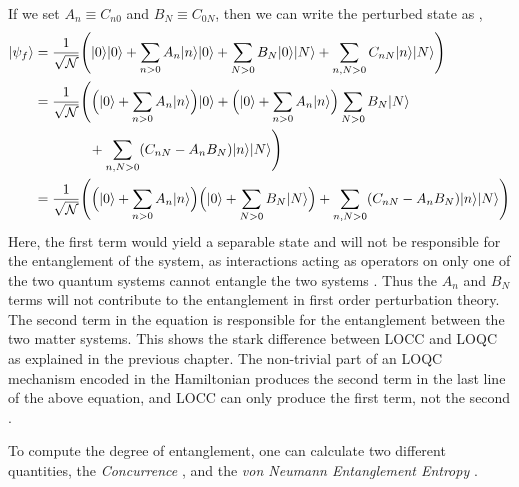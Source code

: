 \documentclass[12pt,a4paper]{report}
\theoremstyle{plain}
\theoremstyle{definition}
\theoremstyle{remark}
\DeclarePairedDelimiter\ket{\lvert}{\rangle}
\begin{document}
If we set $A_n \equiv C_{n0}$ and $B_N \equiv C_{0N}$, then we can write the perturbed state as \cite{Bala_2012},
\begin{equation}
    \begin{aligned}
        \ket{\psi_f} &= \frac{1}{\sqrt{\mathcal{N}}} \Bigg(\ket{0}\ket{0} + \sum_{n>0} A_n \ket{n}\ket{0} + \sum_{N>0} B_N \ket{0}\ket{N} + \sum_{n, N > 0} C_{nN} \ket{n}\ket{N}\Bigg) \\
        &= \frac{1}{\sqrt{\mathcal{N}}} \Bigg( \Big(\ket{0} + \sum_{n>0} A_n \ket{n}\Big) \ket{0} + \Big(\ket{0} + \sum_{n>0} A_n \ket{n}\Big) \sum_{N>0} B_N \ket{N}\\ &\qquad\qquad + \sum_{n, N > 0} (C_{nN} - A_nB_N) \ket{n}\ket{N} \Bigg)\\
        &= \frac{1}{\sqrt{\mathcal{N}}} \Bigg( \Big(\ket{0} + \sum_{n>0} A_n \ket{n}\Big)\Big(\ket{0} + \sum_{N>0} B_N \ket{N}\Big) + \sum_{n, N > 0} (C_{nN} - A_nB_N) \ket{n}\ket{N} \Bigg)\\
    \end{aligned}
\end{equation}
Here, the first term would yield a separable state and will not be responsible for the entanglement of the system, as interactions acting as operators on only one of the two quantum systems cannot entangle the two systems \cite{Bose_2022}. Thus the $A_n$ and $B_N$ terms will not contribute to the entanglement in first order perturbation theory. The second term in the equation is responsible for the entanglement between the two matter systems. This shows the stark difference between LOCC and LOQC as explained in the previous chapter. The non-trivial part of an LOQC mechanism encoded in the Hamiltonian produces the second term in the last line of the above equation, and LOCC can only produce the first term, not the second \cite{Bose_2022}.

To compute the degree of entanglement, one can calculate two different quantities, the \textit{Concurrence} \cite{PhysRevLett.78.5022, PhysRevA.64.042315}, and the \textit{von Neumann Entanglement Entropy} \cite{Bala_2012, PhysRevA.101.052110, suddho}.
\end{document}
